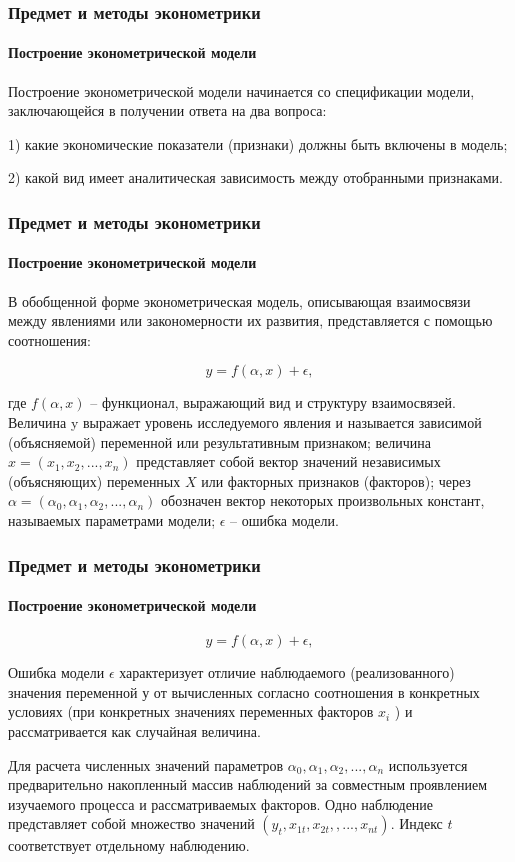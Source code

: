 \documentclass[10pt,pdf,hyperref={unicode}]{beamer}
\begin{document}
\begin{frame}
\frametitle{Предмет и методы эконометрики} 
\framesubtitle{Построение эконометрической модели}

Построение эконометрической модели начинается со спецификации модели, 
заключающейся в получении ответа на два вопроса: 

1) какие экономические
показатели (признаки) должны быть включены в модель; 

2) какой вид имеет аналитическая зависимость между отобранными признаками.


\end{frame}


\begin{frame}
\frametitle{Предмет и методы эконометрики} 
\framesubtitle{Построение эконометрической модели}

В обобщенной форме эконометрическая модель, описывающая взаимосвязи 
между явлениями или закономерности их развития, представляется с помощью соотношения:


$$ y=f(\alpha, x)+\epsilon, $$

где $f(\alpha ,x)$ – функционал, выражающий вид и структуру взаимосвязей. 
Величина y выражает уровень исследуемого явления и называется 
зависимой (объясняемой) переменной или результативным признаком; 
величина $x = (x_1, x_2 ,..., x_n)$ представляет собой 
вектор значений независимых (объясняющих) переменных $X$ или факторных признаков (факторов); 
через $α = ( \alpha_0 , \alpha_1 ,\alpha_2 ,..., \alpha_n )$ обозначен вектор некоторых произвольных констант, 
называемых параметрами модели; $\epsilon$ – ошибка модели.


\end{frame}


\begin{frame}
\frametitle{Предмет и методы эконометрики} 
\framesubtitle{Построение эконометрической модели}

$$ y=f(\alpha, x)+\epsilon, $$


Ошибка модели $\epsilon$ характеризует отличие наблюдаемого (реализованного)
значения переменной у от вычисленных согласно соотношения
в конкретных условиях (при конкретных значениях переменных факторов $x_i$ ) 
и рассматривается как случайная величина.

Для расчета численных значений параметров $ \alpha_0 , \alpha_1 ,\alpha_2 ,..., \alpha_n $
используется предварительно накопленный массив наблюдений за совместным проявлением
изучаемого процесса и рассматриваемых факторов. 
Одно наблюдение представляет собой множество значений $(y_t , x_{1t} , x_{2t} , ,..., x_{nt})$. 
Индекс $t$  соответствует отдельному наблюдению.

\end{frame}
\end{document}
